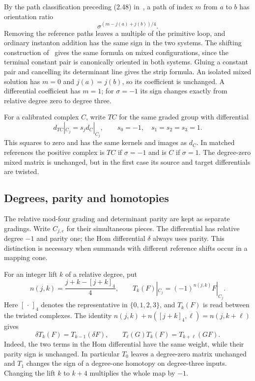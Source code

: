 \documentclass[11pt]{amsart}
\theoremstyle{definition}
\theoremstyle{remark}
\theoremstyle{plain}
\begin{document}
By the path classification preceding (2.48) in~\cite[Section~2.4]{DFL}, a path
of index $m$ from $a$ to $b$ has orientation ratio
\begin{equation}\label{eq:ratio}
 \sigma^{(m-j(a)+j(b))/4}.
\end{equation}
Removing the reference paths leaves a multiple of the primitive
loop, and ordinary instanton addition has the same sign in the
two systems. The shifting construction of~\cite[Sections~4.4 and~4.7]{DFL}
gives the same formula on mixed configurations, since the terminal
constant pair is canonically oriented in both systems. Gluing a
constant pair and cancelling its determinant line gives the strip
formula. An isolated mixed solution has $m=0$ and $j(a)=j(b)$,
so its coefficient is unchanged. A differential coefficient has
$m=1$; for $\sigma=-1$ its sign changes exactly from relative
degree zero to degree three.

For a calibrated complex $C$, write $TC$ for the same graded
group with differential
\begin{equation}\label{eq:twist-d}
 d_{TC}|_{C_j}=s_jd_C|_{C_j},\qquad
 s_0=-1,\quad s_1=s_2=s_3=1.
\end{equation}
This squares to zero and has the same kernels and images as $d_C$.
In matched references the positive complex is $TC$ if $\sigma=-1$
and is $C$ if $\sigma=1$. The degree-zero mixed matrix is unchanged,
but in the first case its source and target differentials are twisted.

\subsection{Degrees, parity and homotopies}
The relative mod-four grading and determinant parity are kept as
separate gradings. Write $C_{j,e}$ for their simultaneous pieces.
The differential has relative degree $-1$ and parity one; the
Hom differential $\delta$ always uses parity. This distinction
is necessary when summands with different reference shifts occur
in a mapping cone.

For an integer lift $k$ of a relative degree, put
\[
 n(j,k)=\frac{j+k-[j+k]_4}{4},\qquad
 T_k(F)|_{C_j}=(-1)^{n(j,k)}F|_{C_j}.
\]
Here $[\,\cdot\,]_4$ denotes the representative in $\{0,1,2,3\}$,
and $T_k(F)$ is read between the twisted complexes. The identity
$n(j,k)+n([j+k]_4,\ell)=n(j,k+\ell)$ gives
\begin{equation}\label{eq:twist-hom}
 \delta T_k(F)=T_{k-1}(\delta F),\qquad
 T_\ell(G)T_k(F)=T_{k+\ell}(GF).
\end{equation}
Indeed, the two terms in the Hom differential have the same
weight, while their parity sign is unchanged. In particular
$T_0$ leaves a degree-zero matrix unchanged and $T_1$ changes
the sign of a degree-one homotopy on degree-three inputs. Changing
the lift $k$ to $k+4$ multiplies the whole map by $-1$.
\end{document}
